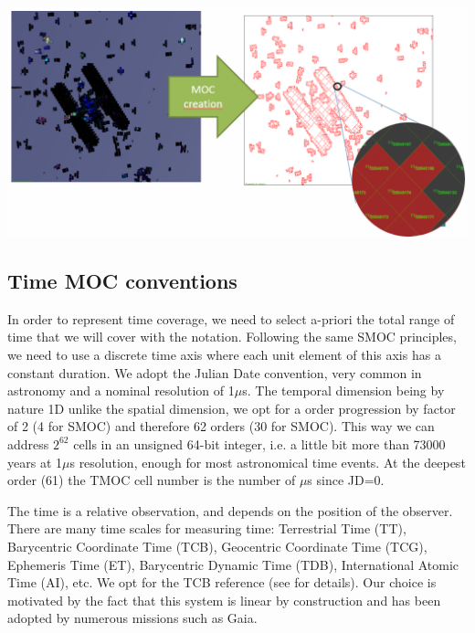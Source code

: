\documentclass[11pt,a4paper]{ivoa}
\begin{document}
\begin{adjustbox}{center,caption={SMOC: from the image
      to the list of numbers based on HEALPix hierarchy tessellation},
    label={fig:smoc-view},nofloat=figure,vspace=\bigskipamount}
\includegraphics[width=\textwidth]{smoc_view.png}
\end{adjustbox}




\subsection{Time MOC conventions}
\label{sec:tmoc1}


In order to represent time coverage, we need to select a-priori the
total range of time that we will cover with the notation. Following
the same SMOC principles, we need to use a discrete time axis where
each unit element of this axis has a constant duration. We adopt
the Julian Date convention, very common in astronomy and a nominal
resolution of 1$\mu$s. The temporal dimension being by nature 1D unlike
the spatial dimension, we opt for a order progression by factor of
2 (4 for SMOC) and therefore 62 orders (30 for SMOC). This way we
can address $2^{62}$ cells in an unsigned 64-bit integer,
i.e. a little bit more than 73000 years at
1$\mu$s resolution, enough for most astronomical time events. At the
deepest order (61) the TMOC cell number is the number of $\mu$s since
JD=0.

The time is a relative observation, and depends on the position of the
observer. There are many time scales for measuring time:
Terrestrial Time (TT), Barycentric Coordinate Time (TCB), Geocentric
Coordinate Time (TCG), Ephemeris Time (ET), Barycentric Dynamic Time
(TDB), International Atomic Time (AI), etc. We opt for the TCB
reference (see \cite{2015A&A...574A..36R} for details). Our
choice is motivated by the fact that this system is linear by
construction and has been adopted by numerous missions such as Gaia.
\end{document}
